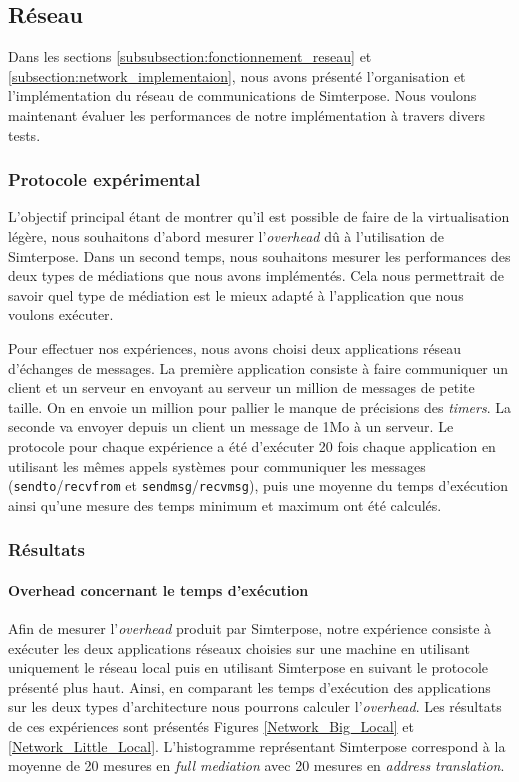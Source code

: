 \subsection{Réseau}
\label{subsection:res}

Dans les sections \ref{subsubsection:fonctionnement_reseau} et \ref{subsection:network_implementaion}, nous avons présenté l'organisation et l'implémentation du réseau de communications de Simterpose. Nous voulons maintenant évaluer les performances de notre implémentation à travers divers tests.

\subsubsection{Protocole expérimental}
L'objectif principal étant de montrer qu'il est possible de faire de la virtualisation légère, nous souhaitons d'abord mesurer l'\textit{overhead} dû à l'utilisation de Simterpose. Dans un second temps, nous souhaitons mesurer les performances des deux types de médiations que nous avons implémentés. Cela nous permettrait de savoir quel type de médiation est le mieux adapté à l'application que nous voulons exécuter.

Pour effectuer nos expériences, nous avons choisi deux applications réseau d'échanges de messages. La première application consiste à faire communiquer un client et un serveur en envoyant au serveur un million de messages de petite taille. On en envoie un million pour pallier le manque de précisions des \textit{timers}. La seconde va envoyer depuis un client un message de 1Mo à un serveur. Le protocole pour chaque expérience a été d'exécuter 20 fois chaque application en utilisant les mêmes appels systèmes pour communiquer les messages (\texttt{sendto}/\texttt{recvfrom} et \texttt{sendmsg}/\texttt{recvmsg}), puis une moyenne du temps d'exécution ainsi qu'une mesure des temps minimum et maximum ont été calculés.

\subsubsection{Résultats}
\paragraph{Overhead concernant le temps d'exécution}
Afin de mesurer l'\textit{overhead} produit par Simterpose, notre expérience consiste à exécuter les deux applications réseaux choisies sur une machine en utilisant uniquement le réseau local puis en utilisant Simterpose en suivant le protocole présenté plus haut. Ainsi, en comparant les temps d'exécution des applications sur les deux types d'architecture nous pourrons calculer l'\textit{overhead}. Les résultats de ces expériences sont présentés Figures \ref{Network_Big_Local} et \ref{Network_Little_Local}. L'histogramme représentant Simterpose correspond à la moyenne de 20 mesures en \textit{full mediation} avec 20 mesures en \textit{address translation}.

